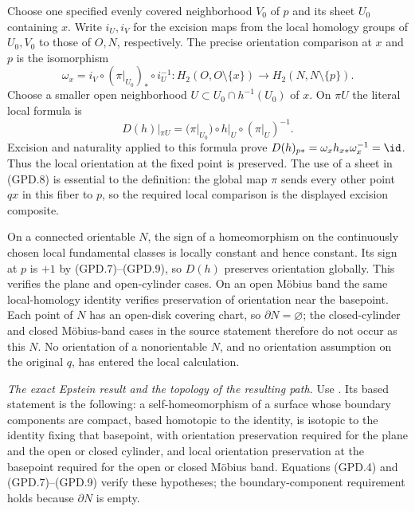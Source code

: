 Choose one specified evenly covered neighborhood $V_0$ of $p$
and its sheet $U_0$ containing $x$. Write $i_U,i_V$ for the
excision maps from the local homology groups of $U_0,V_0$
to those of $O,N$, respectively. The precise orientation
comparison at $x$ and $p$ is the isomorphism
\[
 \omega_x=i_V\circ(\pi|_{U_0})_*\circ i_U^{-1}:
 H_2(O,O\setminus\{x\})
        \longrightarrow H_2(N,N\setminus\{p\}).
                                                               \tag{GPD.8}
\]
Choose a smaller open neighborhood
$U\subset U_0\cap h^{-1}(U_0)$ of $x$.
On $\pi U$ the literal local formula is
\[
 D(h)|_{\pi U}
     =(\pi|_{U_0})\circ h|_U\circ(\pi|_U)^{-1}.
                                                               \tag{GPD.9}
\]
Excision and naturality applied to this formula prove
$D(h)_{p*}=\omega_xh_{x*}\omega_x^{-1}=\id$.
Thus the local orientation at the fixed point is preserved.
The use of a sheet in (GPD.8) is essential to the definition:
the global map $\pi$ sends every other point $qx$ in this fiber
to $p$, so the required local comparison is the displayed
excision composite.

On a connected orientable $N$, the sign of a homeomorphism on
the continuously chosen local fundamental classes is locally
constant and hence constant. Its sign at $p$ is $+1$ by
(GPD.7)--(GPD.9), so $D(h)$ preserves orientation globally.
This verifies the plane and open-cylinder cases.
On an open M\"obius band the same local-homology identity
verifies preservation of orientation near the basepoint.
Each point of $N$ has an open-disk covering chart, so
$\partial N=\varnothing$; the closed-cylinder and closed
M\"obius-band cases in the source statement therefore do
not occur as this $N$. No orientation of a nonorientable
$N$, and no orientation assumption on the original $q$,
has entered the local calculation.

\emph{The exact Epstein result and the topology of the resulting path.}
Use \cite[Theorem~6.4(b), p.~101; proof, pp.~101--103]{C_Epstein1966}.
Its based statement is the following: a self-homeomorphism of a
surface whose boundary components are compact, based homotopic
to the identity, is isotopic to the identity fixing that basepoint,
with orientation preservation required for the plane and the open
or closed cylinder, and local orientation preservation at the
basepoint required for the open or closed M\"obius band.
Equations (GPD.4) and (GPD.7)--(GPD.9) verify these hypotheses;
the boundary-component requirement holds because $\partial N$
is empty.

